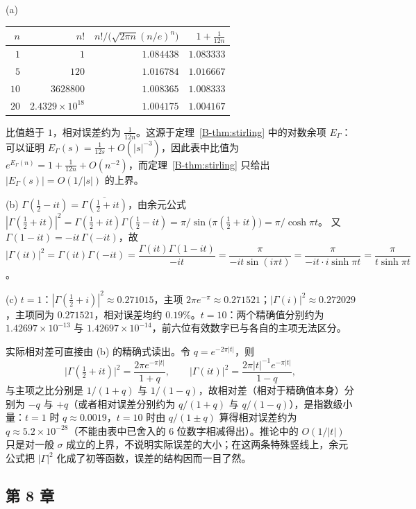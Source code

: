 \documentclass[11pt,a4paper]{article}
\newcommand{\bref}[1]{\ref*{B-#1}}
\begin{document}
(a)
\begin{center}
\begin{tabular}{rrrr}
\toprule
$n$ & $n!$ & $n!/\bigl(\sqrt{2\pi n}(n/e)^n\bigr)$ & $1+\frac1{12n}$\\
\midrule
$1$ & $1$ & $1.084438$ & $1.083333$\\
$5$ & $120$ & $1.016784$ & $1.016667$\\
$10$ & $3628800$ & $1.008365$ & $1.008333$\\
$20$ & $2.4329\times10^{18}$ & $1.004175$ & $1.004167$\\
\bottomrule
\end{tabular}
\end{center}
比值趋于 $1$，相对误差约为 $\frac1{12n}$。这源于定理~\bref{thm:stirling} 中的对数余项 $E_\Gamma$：可以证明 $E_\Gamma(s)=\frac1{12s}+O(|s|^{-3})$，因此表中比值为 $e^{E_\Gamma(n)}=1+\frac1{12n}+O(n^{-2})$，而定理~\bref{thm:stirling} 只给出 $|E_\Gamma(s)|=O(1/|s|)$ 的上界。

(b) $\Gamma(\tfrac12-it)=\overline{\Gamma(\tfrac12+it)}$，由余元公式
$|\Gamma(\tfrac12+it)|^2=\Gamma(\tfrac12+it)\Gamma(\tfrac12-it)=\pi/\sin\bigl(\pi(\tfrac12+it)\bigr)=\pi/\cosh\pi t$。
又 $\Gamma(1-it)=-it\,\Gamma(-it)$，故
$|\Gamma(it)|^2=\Gamma(it)\Gamma(-it)=\dfrac{\Gamma(it)\Gamma(1-it)}{-it}=\dfrac{\pi}{-it\sin(i\pi t)}=\dfrac{\pi}{-it\cdot i\sinh\pi t}=\dfrac{\pi}{t\sinh\pi t}$。

(c) $t=1$：$|\Gamma(\tfrac12+i)|^2\approx0.271015$，主项 $2\pi e^{-\pi}\approx0.271521$；$|\Gamma(i)|^2\approx0.272029$，主项同为 $0.271521$，相对误差均约 $0.19\%$。$t=10$：两个精确值分别约为 $1.42697\times10^{-13}$ 与 $1.42697\times10^{-14}$，前六位有效数字已与各自的主项无法区分。

实际相对差可直接由 (b) 的精确式读出。令 $q=e^{-2\pi|t|}$，则
\[
  \bigl|\Gamma(\tfrac12+it)\bigr|^2=\frac{2\pi e^{-\pi|t|}}{1+q},\qquad
  \bigl|\Gamma(it)\bigr|^2=\frac{2\pi|t|^{-1}e^{-\pi|t|}}{1-q},
\]
与主项之比分别是 $1/(1+q)$ 与 $1/(1-q)$，故相对差（相对于精确值本身）分别为 $-q$ 与 $+q$（或者相对误差分别约为 $q/(1+q)$ 与 $q/(1-q)$），是指数级小量：$t=1$ 时 $q\approx0.0019$，$t=10$ 时由 $q/(1\pm q)$ 算得相对误差约为 $q\approx5.2\times10^{-28}$（不能由表中已舍入的 6 位数字相减得出）。推论中的 $O(1/|t|)$ 只是对一般 $\sigma$ 成立的上界，不说明实际误差的大小；在这两条特殊竖线上，余元公式把 $|\Gamma|^2$ 化成了初等函数，误差的结构因而一目了然。

\subsection*{第 8 章}
\end{document}
